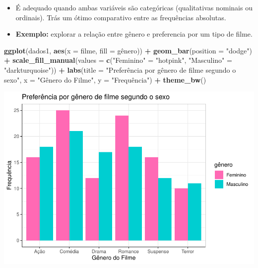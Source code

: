 \documentclass[
]{book}
\newenvironment{Shaded}{\begin{snugshade}}{\end{snugshade}}
\newcommand{\AttributeTok}[1]{\textcolor[rgb]{0.13,0.29,0.53}{#1}}
\newcommand{\FunctionTok}[1]{\textcolor[rgb]{0.13,0.29,0.53}{\textbf{#1}}}
\newcommand{\NormalTok}[1]{#1}
\newcommand{\OtherTok}[1]{\textcolor[rgb]{0.56,0.35,0.01}{#1}}
\newcommand{\SpecialCharTok}[1]{\textcolor[rgb]{0.81,0.36,0.00}{\textbf{#1}}}
\newcommand{\StringTok}[1]{\textcolor[rgb]{0.31,0.60,0.02}{#1}}
\begin{document}
\begin{itemize}
\item
  É adequado quando ambas variáveis são categóricas (qualitativas nominais ou ordinais). Trás um ótimo comparativo entre as frequências absolutas.
\item
  \textbf{Exemplo:} explorar a relação entre gênero e preferencia por um tipo de filme.
\end{itemize}

\begin{Shaded}
\begin{Highlighting}[]
\FunctionTok{ggplot}\NormalTok{(dados1, }\FunctionTok{aes}\NormalTok{(}\AttributeTok{x =}\NormalTok{ filme, }\AttributeTok{fill =}\NormalTok{ gênero)) }\SpecialCharTok{+}
  \FunctionTok{geom\_bar}\NormalTok{(}\AttributeTok{position =} \StringTok{"dodge"}\NormalTok{) }\SpecialCharTok{+}
  \FunctionTok{scale\_fill\_manual}\NormalTok{(}\AttributeTok{values =} \FunctionTok{c}\NormalTok{(}\StringTok{"Feminino"} \OtherTok{=} \StringTok{"hotpink"}\NormalTok{,   }
                               \StringTok{"Masculino"} \OtherTok{=} \StringTok{"darkturquoise"}\NormalTok{)) }\SpecialCharTok{+}
  \FunctionTok{labs}\NormalTok{(}\AttributeTok{title =} \StringTok{"Preferência por gênero de filme segundo o sexo"}\NormalTok{,}
       \AttributeTok{x =} \StringTok{"Gênero do Filme"}\NormalTok{, }\AttributeTok{y =} \StringTok{"Frequência"}\NormalTok{) }\SpecialCharTok{+}
  \FunctionTok{theme\_bw}\NormalTok{()}
\end{Highlighting}
\end{Shaded}

\begin{center}\includegraphics{AED_files/figure-latex/graf_barras2-1} \end{center}
\end{document}
